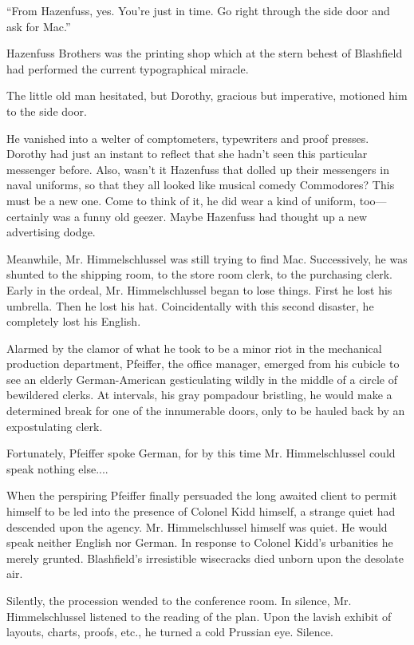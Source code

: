 \documentclass[nohyper,openany,nobib]{tufte-book}
\begin{document}
``From Hazenfuss, yes. You're just in time. Go right through the side
door and ask for Mac.''

Hazenfuss Brothers was the printing shop which at the stern behest of
Blashfield had performed the current typographical miracle.

The little old man hesitated, but Dorothy, gracious but imperative,
motioned him to the side door.

He vanished into a welter of comptometers, typewriters and proof
presses. Dorothy had just an instant to reflect that she hadn't seen
this particular messenger before. Also, wasn't it Hazenfuss that dolled
up their messengers in naval uniforms, so that they all looked like
musical comedy Commodores? This must be a new one. Come to think of it,
he did wear a kind of uniform, too---certainly was a funny old geezer.
Maybe Hazenfuss had thought up a new advertising dodge.

Meanwhile, Mr. Himmelschlussel was still trying to find Mac.
Successively, he was shunted to the shipping room, to the store room
clerk, to the purchasing clerk. Early in the ordeal, Mr. Himmelschlussel
began to lose things. First he lost his umbrella. Then he lost his hat.
Coincidentally with this second disaster, he completely lost his
English.

Alarmed by the clamor of what he took to be a minor riot in the
mechanical production department, Pfeiffer, the office manager, emerged
from his cubicle to see an elderly German-American gesticulating wildly
in the middle of a circle of bewildered clerks. At intervals, his gray
pompadour bristling, he would make a determined break for one of the
innumerable doors, only to be hauled back by an expostulating clerk.

Fortunately, Pfeiffer spoke German, for by this time Mr. Himmelschlussel
could speak nothing else....

When the perspiring Pfeiffer finally persuaded the long awaited client
to permit himself to be led into the presence of Colonel Kidd himself, a
strange quiet had descended upon the agency. Mr. Himmelschlussel himself
was quiet. He would speak neither English nor German. In response to
Colonel Kidd's urbanities he merely grunted. Blashfield's irresistible
wisecracks died unborn upon the desolate air.

Silently, the procession wended to the conference room. In silence, Mr.
Himmelschlussel listened to the reading of the plan. Upon the lavish
exhibit of layouts, charts, proofs, etc., he turned a cold Prussian eye.
Silence.
\end{document}
